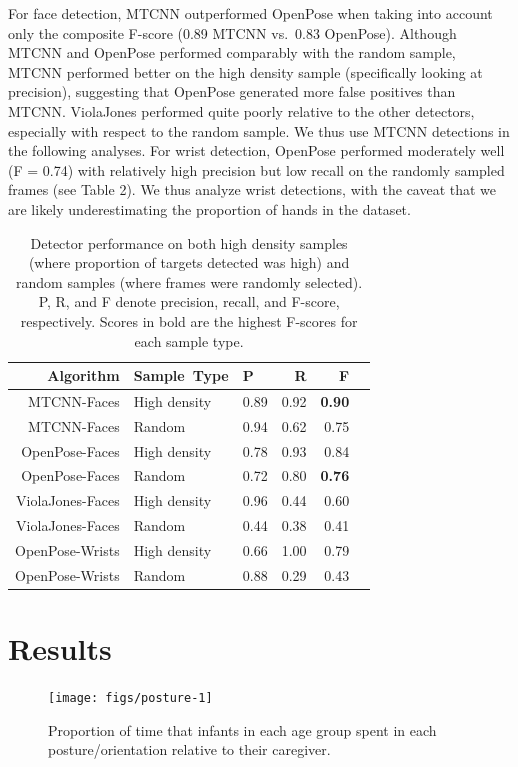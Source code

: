 \documentclass[10pt, letterpaper]{article}
\newenvironment{CodeChunk}{}{}
\begin{document}
For face detection, MTCNN outperformed OpenPose when taking into account
only the composite F-score (0.89 MTCNN vs.~0.83 OpenPose). Although
MTCNN and OpenPose performed comparably with the random sample, MTCNN
performed better on the high density sample (specifically looking at
precision), suggesting that OpenPose generated more false positives than
MTCNN. ViolaJones performed quite poorly relative to the other
detectors, especially with respect to the random sample. We thus use
MTCNN detections in the following analyses. For wrist detection,
OpenPose performed moderately well (F = 0.74) with relatively high
precision but low recall on the randomly sampled frames (see Table 2).
We thus analyze wrist detections, with the caveat that we are likely
underestimating the proportion of hands in the dataset.

\begin{table}[ht]
\centering
\begin{tabular}{rllrrr}
\hline
Algorithm & Sample\ Type & P & R & F \\ 
\hline
MTCNN-Faces & High density & 0.89 & 0.92 & \textbf{0.90} \\ 
MTCNN-Faces & Random & 0.94 & 0.62 & 0.75 \\ 
OpenPose-Faces & High density & 0.78 & 0.93 & 0.84 \\ 
OpenPose-Faces & Random & 0.72 & 0.80 & \textbf{0.76} \\ 
ViolaJones-Faces & High density & 0.96 & 0.44 & 0.60 \\ 
ViolaJones-Faces & Random & 0.44 & 0.38 & 0.41 \\ 
OpenPose-Wrists & High density & 0.66 & 1.00 & 0.79 \\ 
OpenPose-Wrists & Random & 0.88 & 0.29 & 0.43 \\ 
\hline
\end{tabular}
\caption{Detector performance on both high density samples (where proportion of targets detected was high) and random samples (where frames were randomly selected). P, R, and F denote precision, recall, and F-score, respectively. Scores in bold are the highest F-scores for each sample type.} 
\vspace{-1em}
\end{table}

\section{Results}\label{results}

\begin{CodeChunk}
\begin{figure}[h]

{\centering \texttt{[image: figs/posture-1]} 

}

\caption[Proportion of time that infants in each age group spent in each posture/orientation relative to their caregiver]{Proportion of time that infants in each age group spent in each posture/orientation relative to their caregiver.}\label{fig:posture}
\end{figure}
\end{CodeChunk}
\end{document}
